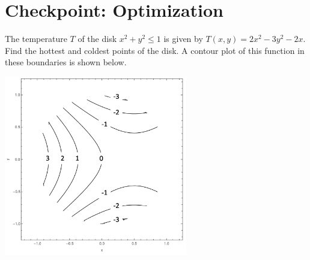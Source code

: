 


%


\allowdisplaybreaks
\section{Checkpoint: Optimization}
The temperature $T$ of the disk $x^2+y^2 \leq 1$ is given by $T(x,y)=2x^2-3y^2-2x$. Find the hottest and coldest points of the disk. A contour plot of this function in these boundaries is shown below.

\includegraphics[width=0.6\textwidth]{../images/checkpoint-optimization.png}
	
